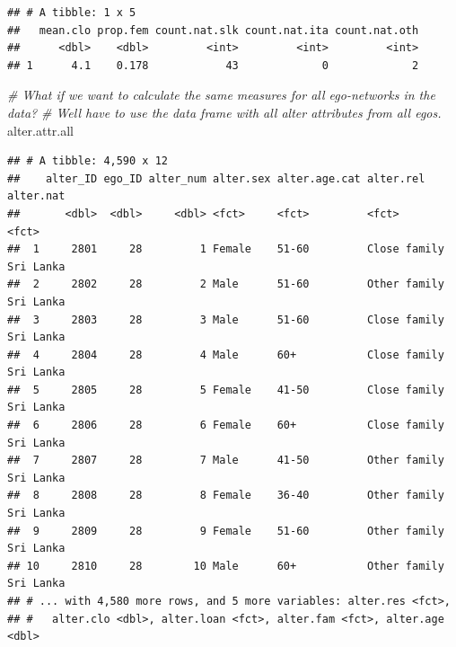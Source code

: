\documentclass[
]{book}
\newenvironment{Shaded}{\begin{snugshade}}{\end{snugshade}}
\newcommand{\CommentTok}[1]{\textcolor[rgb]{0.56,0.35,0.01}{\textit{#1}}}
\newcommand{\NormalTok}[1]{#1}
\begin{document}
\begin{verbatim}
## # A tibble: 1 x 5
##   mean.clo prop.fem count.nat.slk count.nat.ita count.nat.oth
##      <dbl>    <dbl>         <int>         <int>         <int>
## 1      4.1    0.178            43             0             2
\end{verbatim}

\begin{Shaded}
\begin{Highlighting}[]
\CommentTok{\# What if we want to calculate the same measures for all ego{-}networks in the data?}
\CommentTok{\# We\textquotesingle{}ll have to use the data frame with all alter attributes from all egos.}
\NormalTok{alter.attr.all}
\end{Highlighting}
\end{Shaded}

\begin{verbatim}
## # A tibble: 4,590 x 12
##    alter_ID ego_ID alter_num alter.sex alter.age.cat alter.rel    alter.nat
##       <dbl>  <dbl>     <dbl> <fct>     <fct>         <fct>        <fct>    
##  1     2801     28         1 Female    51-60         Close family Sri Lanka
##  2     2802     28         2 Male      51-60         Other family Sri Lanka
##  3     2803     28         3 Male      51-60         Close family Sri Lanka
##  4     2804     28         4 Male      60+           Close family Sri Lanka
##  5     2805     28         5 Female    41-50         Close family Sri Lanka
##  6     2806     28         6 Female    60+           Close family Sri Lanka
##  7     2807     28         7 Male      41-50         Other family Sri Lanka
##  8     2808     28         8 Female    36-40         Other family Sri Lanka
##  9     2809     28         9 Female    51-60         Other family Sri Lanka
## 10     2810     28        10 Male      60+           Other family Sri Lanka
## # ... with 4,580 more rows, and 5 more variables: alter.res <fct>,
## #   alter.clo <dbl>, alter.loan <fct>, alter.fam <fct>, alter.age <dbl>
\end{verbatim}
\end{document}
